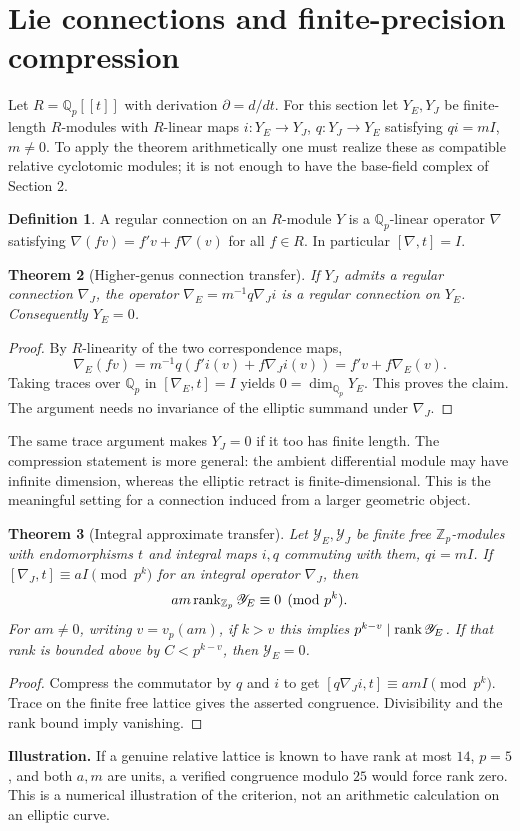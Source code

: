\documentclass[11pt,a4paper]{article}
\newtheorem{theorem}{Theorem}[section]\newtheorem{proposition}[theorem]{Proposition}\newtheorem{corollary}[theorem]{Corollary}\theoremstyle{definition}\newtheorem{definition}[theorem]{Definition}\newtheorem{remark}[theorem]{Remark}
\newcommand{\Zp}{\mathbb Z_p}\newcommand{\Qp}{\mathbb Q_p}\newcommand{\Q}{\mathbb Q}\newcommand{\Sha}{\mathop{\mathrm{\mathit{\mathstrut Ш}}}} %
\renewcommand{\Sha}{\operatorname{Sha}}
\begin{document}
\section{Lie connections and finite-precision compression}
Let $R=\Qp[[t]]$ with derivation $\partial=d/dt$. For this section let $Y_E,Y_J$ be finite-length $R$-modules with $R$-linear maps $i:Y_E\to Y_J$, $q:Y_J\to Y_E$ satisfying $qi=mI$, $m\ne0$. To apply the theorem arithmetically one must realize these as compatible relative cyclotomic modules; it is not enough to have the base-field complex of Section 2.
\begin{definition}
A regular connection on an $R$-module $Y$ is a $\Qp$-linear operator $\nabla$ satisfying $\nabla(fv)=f'v+f\nabla(v)$ for all $f\in R$. In particular $[\nabla,t]=I$.
\end{definition}
\begin{theorem}[Higher-genus connection transfer]\label{thm:lie}
If $Y_J$ admits a regular connection $\nabla_J$, the operator $\nabla_E=m^{-1}q\nabla_Ji$ is a regular connection on $Y_E$. Consequently $Y_E=0$.
\end{theorem}
\begin{proof}
By $R$-linearity of the two correspondence maps,
\[
\nabla_E(fv)=m^{-1}q(f'i(v)+f\nabla_Ji(v))=f'v+f\nabla_E(v).
\]
Taking traces over $\Qp$ in $[\nabla_E,t]=I$ yields $0=\dim_{\Qp}Y_E$. This proves the claim. The argument needs no invariance of the elliptic summand under $\nabla_J$.
\end{proof}
The same trace argument makes $Y_J=0$ if it too has finite length. The compression statement is more general: the ambient differential module may have infinite dimension, whereas the elliptic retract is finite-dimensional. This is the meaningful setting for a connection induced from a larger geometric object.

\begin{theorem}[Integral approximate transfer]\label{thm:approx}
Let $\mathscr Y_E,\mathscr Y_J$ be finite free $\Zp$-modules with endomorphisms $t$ and integral maps $i,q$ commuting with them, $qi=mI$. If $[\nabla_J,t]\equiv aI\pmod{p^k}$ for an integral operator $\nabla_J$, then
\[
 am\rk_{\Zp}\mathscr Y_E\equiv0\pmod{p^k}.
\]
For $am\ne0$, writing $v=v_p(am)$, if $k>v$ this implies $p^{k-v}\mid\operatorname{rank}\mathscr Y_E$. If that rank is bounded above by $C<p^{k-v}$, then $\mathscr Y_E=0$.
\end{theorem}
\begin{proof}
Compress the commutator by $q$ and $i$ to get $[q\nabla_Ji,t]\equiv amI\pmod{p^k}$. Trace on the finite free lattice gives the asserted congruence. Divisibility and the rank bound imply vanishing.
\end{proof}
\textbf{Illustration.} If a genuine relative lattice is known to have rank at most $14$, $p=5$, and both $a,m$ are units, a verified congruence modulo $25$ would force rank zero. This is a numerical illustration of the criterion, not an arithmetic calculation on an elliptic curve.
\newpage
\end{document}
